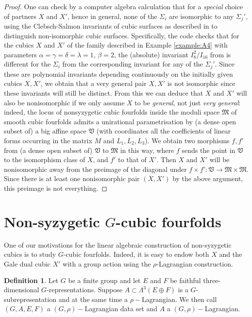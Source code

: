 \documentclass[11pt]{amsart}
\theoremstyle{plain}
\numberwithin{equation}{section}
\theoremstyle{definition}
\newtheorem{definition}[theorem]{Definition}
\theoremstyle{remark}
\begin{document}
\begin{proof}
One can check by a computer algebra calculation that for a \emph{special}  choice of partners $X$ and $X'$, hence in general, none of the $\Sigma_i$ are isomorphic to any $\Sigma_j'$, using the Clebsch-Salmon invariants of cubic surfaces as described in \cite{ElsenhansJahnel} to distinguish non-isomorphic cubic surfaces. Specifically, the code checks \cite[Sections5-8.m2]{MacaulayFiles} that for the cubics $X$ and $X'$ of the family described in Example \ref{example:A4} with parameters $\alpha=\gamma=\delta =\lambda =1$, $\beta =2$, the (absolute) invariant  $I_8^2/I_{16}$ from \cite[Prop. 6.2]{ElsenhansJahnel} is different for the $\Sigma_i$ from the corresponding invariant for any of the $\Sigma_j'$. Since these are polynomial invariants depending continuously on the initially given cubics $X, X'$, we obtain that a very general pair $X, X'$ is not isomorphic since these invariants will still be distinct. From this we can deduce that $X$ and $X'$ will also be nonisomorphic if we only assume $X$ to be \emph{general}, not just \emph{very general}: indeed, the locus of  nonsyzygetic cubic fourfolds inside the moduli space $\mathfrak{M}$ of smooth cubic fourfolds admits a unirational parametrisation by (a dense open subset of) a big affine space $\mathfrak{V}$ (with coordinates all the coefficients of linear forms occurring in the matrix $M$ and $L_1, L_2, L_3$). We obtain two morphisms $f, f'$ from (a dense open subset of) $\mathfrak{V}$ to $\mathfrak{M}$ in this way, where $f$ sends the point in $\mathfrak{V}$ to the isomorphism class of $X$, and $f'$ to that of $X'$. Then $X$ and $X'$ will be nonisomorphic away from the preimage of the diagonal under $f \times f' \colon \mathfrak{V} \to \mathfrak{M}\times \mathfrak{M}$. Since there is at least one nonisomorphic pair $(X, X')$ by the above argument, this preimage is not everything. 
\end{proof}




\section{Non-syzygetic $G$-cubic fourfolds}\label{sGActions}
One of our motivations for the linear algebraic construction of non-syzygetic cubics is to study $G$-cubic fourfolds. Indeed, it is easy to endow both $X$ and the Gale dual cubic $X'$ with a group action using the $\rho$-Lagrangian construction.

\begin{definition}\label{dGLagrangianData}
Let $G$ be a finite group and let $E$ and $F$ be faithful three-dimensional $G$-representations. Suppose $A \subset \Lambda^3 (E\oplus F)$ is a $G$-subrepresentation and at the same time a $\rho-$Lagrangian. We then call $(G, A, E, F)$ a $(G, \rho)-$Lagrangian data set and $A$ a $(G, \rho)-$Lagrangian.
\end{definition}
\end{document}
